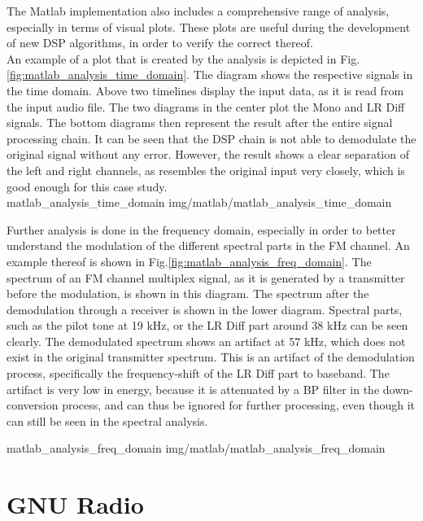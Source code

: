 The Matlab implementation also includes a comprehensive range of analysis, especially in terms of visual plots.
These plots are useful during the development of new DSP algorithms, in order to verify the correct thereof.\\

An example of a plot that is created by the analysis is depicted in Fig.\ref{fig:matlab_analysis_time_domain}.
The diagram shows the respective signals in the time domain.
Above two timelines display the input data, as it is read from the input audio file.
The two diagrams in the center plot the Mono and LR Diff signals.
The bottom diagrams then represent the result after the entire signal processing chain.
It can be seen that the DSP chain is not able to demodulate the original signal without any error.
However, the result shows a clear separation of the left and right channels, as resembles the original input very closely, which is good enough for this case study.\\

 {matlab_analysis_time_domain} {img/matlab/matlab_analysis_time_domain}

Further analysis is done in the frequency domain, especially in order to better understand the modulation of the different spectral parts in the FM channel.
An example thereof is shown in Fig.\ref{fig:matlab_analysis_freq_domain}.
The spectrum of an FM channel multiplex signal, as it is generated by a transmitter before the modulation, is shown in this diagram.
The spectrum after the demodulation through a receiver is shown in the lower diagram.
Spectral parts, such as the pilot tone at 19 kHz, or the LR Diff part around 38 kHz can be seen clearly.
The demodulated spectrum shows an artifact at 57 kHz, which does not exist in the original transmitter spectrum.
This is an artifact of the demodulation process, specifically the frequency-shift of the LR Diff part to baseband.
The artifact is very low in energy, because it is attenuated by a BP filter in the down-conversion process, and can thus be ignored for further processing, even though it can still be seen in the spectral analysis.

 {matlab_analysis_freq_domain} {img/matlab/matlab_analysis_freq_domain}

\section{GNU Radio}

